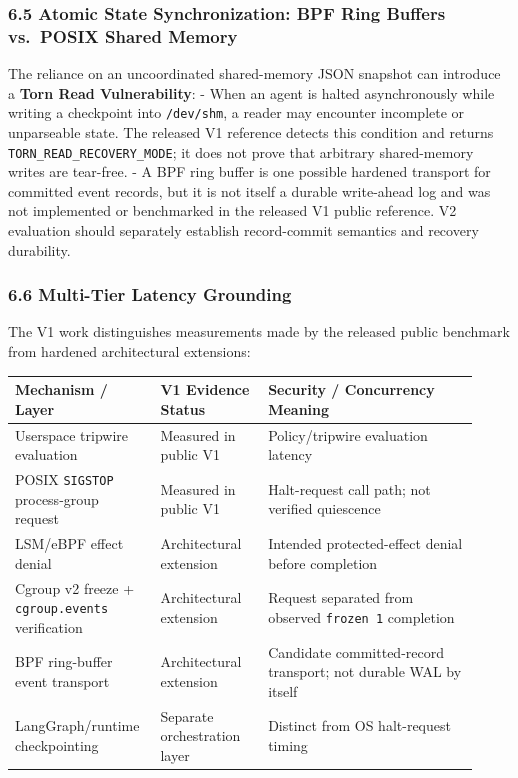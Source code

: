 \documentclass[
  10pt,letterpaper]{article}
\begin{document}
\subsubsection{6.5 Atomic State Synchronization: BPF Ring Buffers
vs.~POSIX Shared
Memory}\label{atomic-state-synchronization-bpf-ring-buffers-vs.-posix-shared-memory}

The reliance on an uncoordinated shared-memory JSON snapshot can
introduce a \textbf{Torn Read Vulnerability}: - When an agent is halted
asynchronously while writing a checkpoint into \texttt{/dev/shm}, a reader
may encounter incomplete or unparseable state. The released V1 reference
detects this condition and returns \texttt{TORN\_READ\_RECOVERY\_MODE};
it does not prove that arbitrary shared-memory writes are tear-free. - A
BPF ring buffer is one possible hardened transport for committed event
records, but it is not itself a durable write-ahead log and was not
implemented or benchmarked in the released V1 public reference. V2
evaluation should separately establish record-commit semantics and recovery
durability.

\subsubsection{6.6 Multi-Tier Latency
Grounding}\label{multi-tier-latency-grounding}

The V1 work distinguishes measurements made by the released public
benchmark from hardened architectural extensions:

\begin{table}[htbp]
\centering
\begin{tabular}{@{}
  >{\raggedright\arraybackslash}p{0.27\linewidth}
  >{\raggedright\arraybackslash}p{0.22\linewidth}
  >{\raggedright\arraybackslash}p{0.43\linewidth}@{}}
\toprule
Mechanism / Layer & V1 Evidence Status & Security / Concurrency Meaning \\
\midrule
Userspace tripwire evaluation & Measured in public V1 & Policy/tripwire evaluation latency \\
POSIX \texttt{SIGSTOP} process-group request & Measured in public V1 & Halt-request call path; not verified quiescence \\
LSM/eBPF effect denial & Architectural extension & Intended protected-effect denial before completion \\
Cgroup v2 freeze + \texttt{cgroup.events} verification & Architectural extension & Request separated from observed \texttt{frozen 1} completion \\
BPF ring-buffer event transport & Architectural extension & Candidate committed-record transport; not durable WAL by itself \\
LangGraph/runtime checkpointing & Separate orchestration layer & Distinct from OS halt-request timing \\
\bottomrule
\end{tabular}
\end{table}
\end{document}
